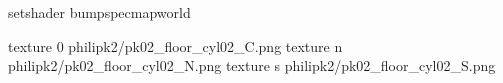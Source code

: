 setshader bumpspecmapworld

texture 0 philipk2/pk02_floor_cyl02_C.png
texture n philipk2/pk02_floor_cyl02_N.png
texture s philipk2/pk02_floor_cyl02_S.png

